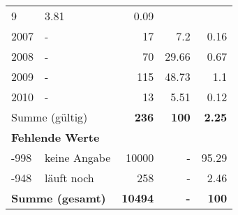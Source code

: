 \begin{longtable}{lXrrr}
       \num{9} &
       \num[round-mode=places,round-precision=2]{3.81} &
         \num[round-mode=places,round-precision=2]{0.09} \\

     2007 &
     \multicolumn{1}{X}{ -  } &


       \num{17} &
       \num[round-mode=places,round-precision=2]{7.2} &
         \num[round-mode=places,round-precision=2]{0.16} \\

     2008 &
     \multicolumn{1}{X}{ -  } &


       \num{70} &
       \num[round-mode=places,round-precision=2]{29.66} &
         \num[round-mode=places,round-precision=2]{0.67} \\

     2009 &
     \multicolumn{1}{X}{ -  } &


       \num{115} &
       \num[round-mode=places,round-precision=2]{48.73} &
         \num[round-mode=places,round-precision=2]{1.1} \\

     2010 &
     \multicolumn{1}{X}{ -  } &


       \num{13} &
       \num[round-mode=places,round-precision=2]{5.51} &
         \num[round-mode=places,round-precision=2]{0.12} \\
     \midrule
     \multicolumn{2}{l}{Summe (gültig)} &
       \textbf{\num{236}} &
     \textbf{\num{100}} &
       \textbf{\num[round-mode=places,round-precision=2]{2.25}} \\
     \multicolumn{5}{l}{\textbf{Fehlende Werte}}\\
       -998 &
       keine Angabe &
         \num{10000} &
        - &
         \num[round-mode=places,round-precision=2]{95.29} \\
       -948 &
       läuft noch &
         \num{258} &
        - &
         \num[round-mode=places,round-precision=2]{2.46} \\
     \midrule
     \multicolumn{2}{l}{\textbf{Summe (gesamt)}} &
          \textbf{\num{10494}} &
        \textbf{-} &
        \textbf{\num{100}} \\
     \bottomrule
     \end{longtable}
     
